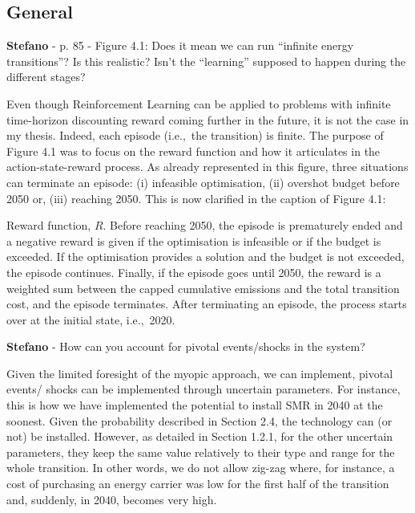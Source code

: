 \documentclass[12pt,a4paper]{article}
\def\ie{i.e.,\ }
\begin{document}
\subsection{General}

\begin{mdframed}[style=comment] %
{\color{orange} \textbf{Stefano}} - p. 85 - Figure 4.1: Does it mean we can run ``infinite energy transitions''? Is this realistic? Isn’t the ``learning'' supposed to happen during the different stages?
\end{mdframed}

\noindent Even though Reinforcement Learning can be applied to problems with infinite time-horizon discounting reward coming further in the future, it is not the case in my thesis. Indeed, each episode (\ie the transition) is finite. The purpose of Figure 4.1 was to focus on the reward function and how it articulates in the action-state-reward process. As already represented in this figure, three situations can terminate an episode: (i) infeasible optimisation, (ii) overshot  budget before 2050 or, (iii) reaching 2050. This is now clarified {\color{blue}in the caption of Figure 4.1}:

\begin{mdframed}[style=manuscript] %
Reward function, $R$. Before reaching 2050, the episode is prematurely ended and a negative reward is given if the optimisation is infeasible or if the  budget is exceeded. If the optimisation provides a solution and the  budget is not exceeded, the episode continues. Finally, if the episode goes until 2050, the reward is a weighted sum between the capped cumulative emissions and the total transition cost, and the episode terminates. After terminating an episode, the process starts over at the initial state, \ie 2020.
\end{mdframed}

\begin{mdframed}[style=comment] %
{\color{orange} \textbf{Stefano}} - How can you account for pivotal events/shocks in the system?
\end{mdframed}

\noindent Given the limited foresight of the myopic approach, we can implement, pivotal events/ shocks can be implemented through uncertain parameters. For instance, this is how we have implemented the potential to install SMR in 2040 at the soonest. Given the probability described in Section 2.4, the technology can (or not) be installed. However, as detailed in Section 1.2.1, for the other uncertain parameters, they keep the same value relatively to their type and range for the whole transition. In other words, we do not allow zig-zag where, for instance, a cost of purchasing an energy carrier was low for the first half of the transition and, suddenly, in 2040, becomes very high.
\end{document}
